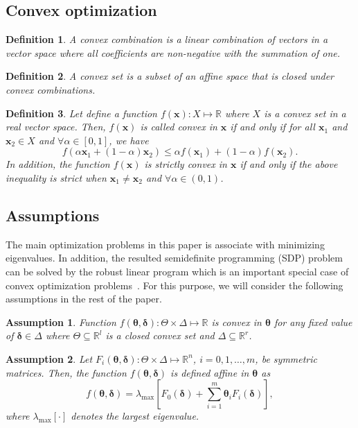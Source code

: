 \documentclass[journal]{IEEEtran}
\newtheorem{defn}{Definition}
\newtheorem{ass}{Assumption}
\newcommand{\parb}[1]{\left[{#1}\right]}
\begin{document}
\subsection{Convex optimization}
\begin{defn}
	A convex combination is a linear combination of vectors in a vector space where all coefficients are non-negative with the summation of one.
\end{defn}
\begin{defn}
	A convex set is a subset of an affine space that is closed under convex combinations.
\end{defn}
\begin{defn}
	Let define a function $ f(\mathbf x): X\mapsto {\mathbb{R}} $ where $ X $ is a convex set in a real vector space. Then, $ f(\mathbf x) $ is called convex in $ \mathbf x $ if and only if for all $ \mathbf x_{1} $ and $ \mathbf x_{2} \in X$ and $ \forall \alpha\in [0,1] $, we have
	\begin{equation}\label{key}
		f(\alpha\mathbf x_{1}+(1-\alpha)\mathbf x_{2})\leq \alpha f(\mathbf x_{1})+(1-\alpha)f(\mathbf x_{2}).
	\end{equation}
	In addition, the function $ f(\mathbf x) $ is strictly convex in $ \mathbf x $ if and only if the above inequality is strict when $ \mathbf x_1 \neq \mathbf x_2 $ and $ \forall \alpha\in (0,1) $.
\end{defn}

\subsection{Assumptions}
The main optimization problems in this paper is associate with minimizing eigenvalues. In addition, the resulted semidefinite programming (SDP) problem can be solved by the robust linear program which is an important special case of convex optimization problems~\cite{Calafiore2006scenario, Ben2002tractable, El1998robust}. For this purpose, we will consider the following assumptions in the rest of the paper.
\begin{ass}
	Function $f(\boldsymbol\theta, \boldsymbol\delta): \Theta \times\Delta \mapsto \mathbb R $ is convex in $\boldsymbol\theta$ for any fixed value of $\boldsymbol\delta \in \Delta$ where $\Theta \subseteq \mathbb{R}^{l}$ is a closed convex set and $\Delta \subseteq \mathbb{R}^{r} $.
\end{ass}

\begin{ass}
	Let $ F_i(\mathbf \theta,\boldsymbol \delta) : \Theta \times\Delta \mapsto \mathbb R^n $, $ i=0,1,\ldots,m $, be symmetric matrices. Then, the function $f(\mathbf \theta ,\boldsymbol \delta)$ is defined affine in $\mathbf \theta $ as
	\begin{equation}\label{key}
		f(\mathbf \theta, \boldsymbol \delta)= \lambda_{\max} \parb{F_0(\boldsymbol \delta) + \sum_{i=1}^{m}\mathbf \theta_iF_i(\boldsymbol \delta)},
	\end{equation}
	where $\lambda_{\max}\parb{\cdot}$ denotes the largest eigenvalue.
\end{ass}
\end{document}
